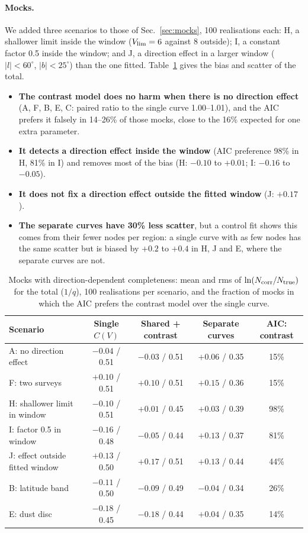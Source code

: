 \documentclass[11pt,a4paper]{article}
\begin{document}
\paragraph{Mocks.} We added three scenarios to those of Sec.~\ref{sec:mocks}, 100 realisations each:
H, a shallower limit inside the window ($V_{\rm lim}=6$ against 8 outside); I, a constant factor 0.5
inside the window; and J, a direction effect in a larger window ($|l|<60^\circ$, $|b|<25^\circ$) than
the one fitted. Table~\ref{tab:region_mock} gives the bias and scatter of the total.
\begin{itemize}
\item \textbf{The contrast model does no harm when there is no direction effect} (A, F, B, E, C: paired
ratio to the single curve 1.00--1.01), and the AIC prefers it falsely in 14--26\% of those mocks, close
to the 16\% expected for one extra parameter.
\item \textbf{It detects a direction effect inside the window} (AIC preference 98\% in H, 81\% in I) and
removes most of the bias (H: $-0.10$ to $+0.01$; I: $-0.16$ to $-0.05$).
\item \textbf{It does not fix a direction effect outside the fitted window} (J: $+0.17$).
\item \textbf{The separate curves have 30\% less scatter}, but a control fit shows this comes from their
fewer nodes per region: a single curve with as few nodes has the same scatter but is biased by $+0.2$
to $+0.4$ in H, J and E, where the separate curves are not.
\end{itemize}

\begin{table}[h]
\centering
\caption{Mocks with direction-dependent completeness: mean and rms of $\ln(N_{\rm corr}/N_{\rm true})$ for the
total ($1/q$), 100 realisations per scenario, and the fraction of mocks in which the AIC prefers the contrast
model over the single curve.}
\label{tab:region_mock}
\small\setlength{\tabcolsep}{4pt}
\begin{tabular}{lcccc}
\toprule
Scenario & Single $C(V)$ & Shared + contrast & Separate curves & AIC: contrast \\
\midrule
A: no direction effect & $-0.04$ / 0.51 & $-0.03$ / 0.51 & $+0.06$ / 0.35 & 15\% \\
F: two surveys & $+0.10$ / 0.51 & $+0.10$ / 0.51 & $+0.15$ / 0.36 & 15\% \\
H: shallower limit in window & $-0.10$ / 0.51 & $+0.01$ / 0.45 & $+0.03$ / 0.39 & 98\% \\
I: factor 0.5 in window & $-0.16$ / 0.48 & $-0.05$ / 0.44 & $+0.13$ / 0.37 & 81\% \\
J: effect outside fitted window & $+0.13$ / 0.50 & $+0.17$ / 0.51 & $+0.13$ / 0.44 & 44\% \\
B: latitude band & $-0.11$ / 0.50 & $-0.09$ / 0.49 & $-0.04$ / 0.34 & 26\% \\
E: dust disc & $-0.18$ / 0.45 & $-0.18$ / 0.44 & $+0.04$ / 0.35 & 14\% \\
\bottomrule
\end{tabular}
\end{table}
\end{document}
